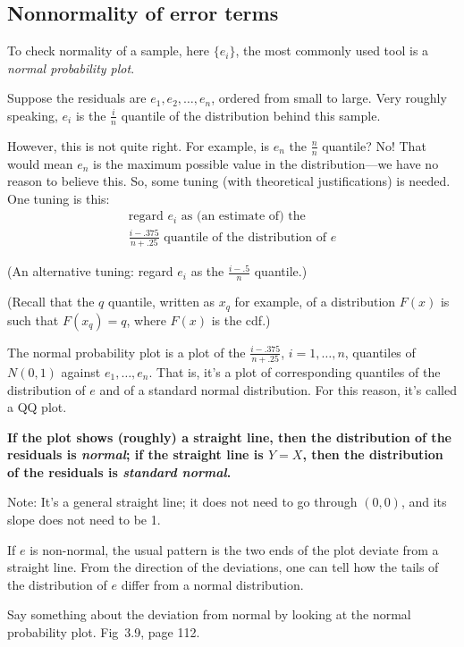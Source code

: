 \documentclass[12pt]{article}
\begin{document}
\subsection{Nonnormality of error terms}

To check normality of a sample,
here $\{e_i\}$, the most commonly used tool is a \emph{normal
probability plot}.

Suppose the residuals are $e_1, e_2, \dotsc, e_n$, ordered from small to
large. Very roughly speaking, $e_i$ is the $\frac{i}{n}$ quantile of
the distribution behind this sample.

However, this is not quite right.
For example, is $e_n$ the $\frac{n}{n}$ quantile?
No! That would mean $e_n$ is the maximum possible value in the
distribution---we have no reason to believe this.
So, some tuning (with theoretical justifications) is needed.
One tuning is this:
\begin{multline*}
\text{regard $e_i$ as (an estimate of) the}\\
    \frac{i-.375}{n+.25} \text{ quantile of the distribution of $e$}
\end{multline*}

(An alternative tuning:
regard $e_i$ as the $\frac{i-.5}{n}$ quantile.)

(Recall that the $q$ quantile, written as $x_q$ for example,
of a distribution $F(x)$ is such that $F(x_q) = q$,
where $F(x)$ is the cdf.)

The normal probability plot is a plot of
the $\frac{i-.375}{n+.25}$, $i=1,\dotsc,n$, quantiles
of $N(0,1)$ against $e_1,\dotsc,e_n$.
That is,
it's a plot of corresponding quantiles of the distribution of $e$ and of
a standard normal distribution.
For this reason, it's called a QQ plot.

\textbf{If the plot shows (roughly) a straight line,
then the distribution of the residuals is \emph{normal};
if the straight line is $Y = X$, then the distribution of the residuals
is \emph{standard normal}.}

Note: It's a general straight line; it does not need to go through
$(0,0)$, and its slope does not need to be 1.

If $e$ is non-normal, the usual pattern is the two ends
of the plot deviate from a straight line.
From the direction of the deviations,
one can tell how the tails of the distribution of $e$
differ from a normal distribution.

\example
Say something about the deviation from normal by looking at
the normal probability plot.
Fig~3.9, page 112.
\end{document}
